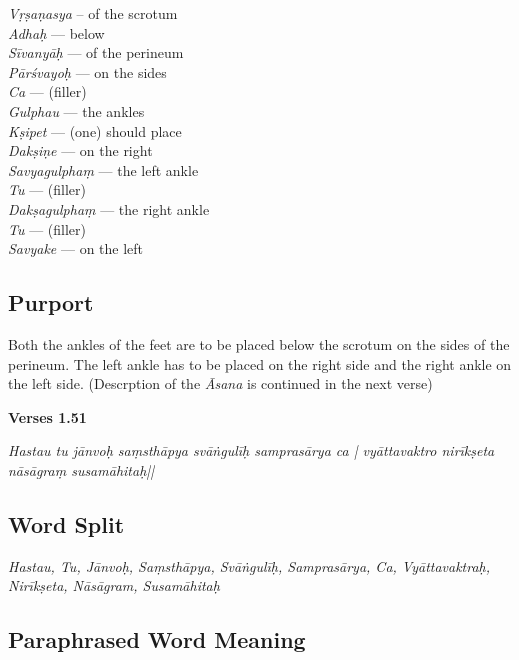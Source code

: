 \begin{multicols}{2}
\textit{Vṛṣaṇasya} -- of the scrotum  \\ 
\textit{Adhaḥ} ---  below  \\
\textit{Sīvanyāḥ} ---  of the perineum  \\
\textit{Pārśvayoḥ} ---  on the sides  \\
\textit{Ca} ---  (filler) \\
\textit{Gulphau} ---  the ankles  \\
\textit{Kṣipet} ---   (one) should place  \\
\textit{Dakṣiṇe} --- on the right  \\
\textit{Savyagulphaṃ} --- the left ankle  \\
\textit{Tu} ---  (filler) \\
\textit{Dakṣagulphaṃ} ---  the right ankle  \\
\textit{Tu} ---  (filler) \\
\textit{Savyake} --- on the left 
\end{multicols}

\subsection*{Purport}
\vspace{-5pt}

Both the ankles of the feet are to be placed below the scrotum on the sides of the perineum. The left ankle has to be placed on the right side and the right ankle on the left side. (Descrption of the \textit{Āsana} is continued in the next verse)

\noindent \textbf{Verses 1.51}

\begin{center}
\textit{Hastau tu jānvoḥ saṃsthāpya svāṅgulīḥ samprasārya ca |
vyāttavaktro nirīkṣeta nāsāgraṃ susamāhitaḥ||}
\end{center}

\subsection*{Word Split}

\textit{Hastau, Tu, Jānvoḥ, Saṃsthāpya, Svāṅgulīḥ, Samprasārya, Ca, Vyāttavaktraḥ, Nirīkṣeta, Nāsāgram, Susamāhitaḥ}

\subsection*{Paraphrased Word Meaning}

